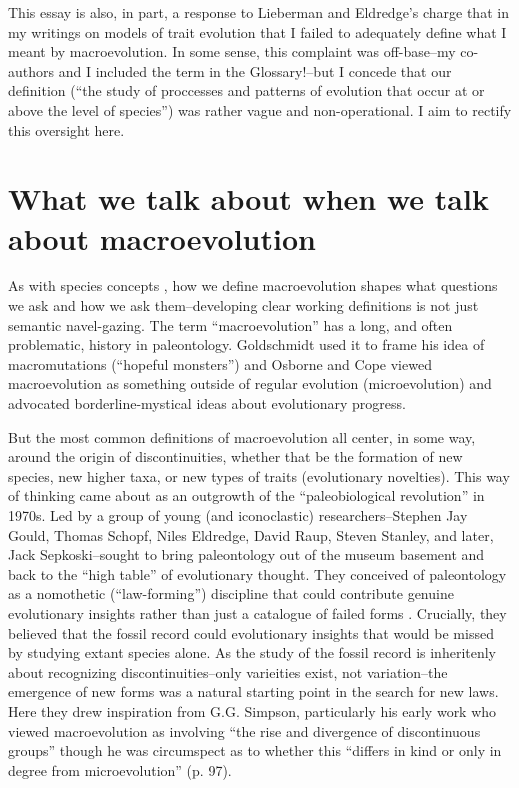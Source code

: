 This essay is also, in part, a response to Lieberman and Eldredge's \citeyearpar{LiebermanTREE} charge that in my writings on models of trait evolution \citep[][\textsc{Chapter 2} of this dissertation]{PennellPE} that I failed to adequately define what I meant by macroevolution. In some sense, this complaint was off-base--my co-authors and I included the term in the Glossary!--but I concede that our definition (``the study of proccesses and patterns of evolution that occur at or above the level of species'') was rather vague and non-operational. I aim to rectify this oversight here.

\section{What we talk about when we talk about macroevolution}

As with species concepts \citep[reviewed in][]{CoyneOrr}, how we define macroevolution shapes what questions we ask and how we ask them--developing clear working definitions is not just semantic navel-gazing. The term ``macroevolution'' has a long, and often problematic, history in paleontology. Goldschmidt used it to frame his idea of macromutations (``hopeful monsters'') and Osborne and Cope viewed macroevolution as something outside of regular evolution (microevolution) and advocated borderline-mystical ideas about evolutionary progress.

But the most common definitions of macroevolution all center, in some way, around the origin of discontinuities, whether that be the formation of new species, new higher taxa, or new types of traits (evolutionary novelties). This way of thinking came about as an outgrowth of the ``paleobiological revolution'' in 1970s. Led by a group of young (and iconoclastic) researchers--Stephen Jay Gould, Thomas Schopf, Niles Eldredge, David Raup, Steven Stanley, and later, Jack Sepkoski--sought to bring paleontology out of the museum basement and back to the ``high table'' of evolutionary thought. They conceived of paleontology as a nomothetic (``law-forming'') discipline that could contribute genuine evolutionary insights rather than just a catalogue of failed forms \citep[for a fascinating history of the origin of modern paleontology, see][]{Sepkoskibook}. Crucially, they believed that the fossil record could evolutionary insights that would be missed by studying extant species alone. As the study of the fossil record is inheritenly about recognizing discontinuities--only varieities exist, not variation--the emergence of new forms was a natural starting point in the search for new laws. Here they drew inspiration from G.G. Simpson, particularly his early work \citep[e.g.,][his later writings seemed a retreat back to the evolutionary mainstream]{Simpson1944} who viewed macroevolution as involving ``the  rise and divergence of discontinuous groups'' though he was circumspect as to whether this ``differs in kind or only in degree from microevolution'' (p. 97).

